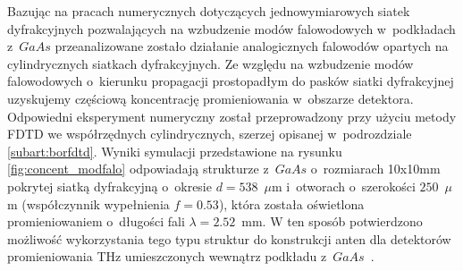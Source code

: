 Bazując na pracach numerycznych dotyczących  jednowymiarowych siatek dyfrakcyjnych pozwalających na wzbudzenie modów falowodowych w~podkładach z~$GaAs$ przeanalizowane zostało działanie analogicznych falowodów opartych na cylindrycznych siatkach dyfrakcyjnych. Ze względu na wzbudzenie modów falowodowych o~kierunku propagacji prostopadłym do pasków siatki dyfrakcyjnej uzyskujemy częściową koncentrację promieniowania w~obszarze detektora. Odpowiedni eksperyment numeryczny został przeprowadzony przy użyciu metody FDTD we współrzędnych cylindrycznych, szerzej opisanej w~podrozdziale \ref{subart:borfdtd}. Wyniki symulacji przedstawione na rysunku \ref{fig:concent_modfalo} odpowiadają strukturze z~$GaAs$ o~rozmiarach 10x10mm pokrytej siatką dyfrakcyjną o~okresie $d=538$~$\mu$m i~otworach o~szerokości $250$~$\mu$m (współczynnik wypełnienia $f=0.53$), która została oświetlona promieniowaniem o~długości fali $\lambda=2.52$~mm. W ten sposób potwierdzono możliwość wykorzystania tego typu struktur do konstrukcji anten dla detektorów promieniowania THz umieszczonych wewnątrz podkładu z~$GaAs$~\cite{Stolarek2011}.

